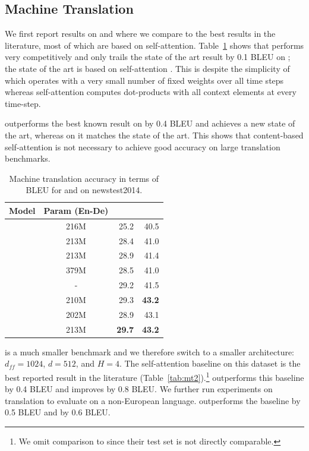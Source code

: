 \subsection{Machine Translation}\label{sec:translation}

We first report results on \ende{} and \enfr{} where we compare to the best results in the literature, most of which are based on self-attention.
Table~\ref{tab:mt1} shows that \sdconv{} performs very competitively and only trails the state of the art result by 0.1 BLEU on \enfr{}; the state of the art is based on self-attention \citep{ott2018scaling}.
This is despite the simplicity of \sdconv{} which operates with a very small number of fixed weights over all time steps whereas self-attention computes dot-products with all context elements at every time-step.

\tvsdconv{} outperforms the best known result on \ende{} by 0.4 BLEU and achieves a new state of the art, whereas on \enfr{} it matches the state of the art.
This shows that content-based self-attention is not necessary to achieve good accuracy on large translation benchmarks.

\begin{table}[t]
\centering
\begin{tabular}{lcrr}
\toprule
Model & Param (En-De) & \ende{} & \enfr{} \\
\midrule
\citet{gehring2017convs2s} & 216M & 25.2 & 40.5 \\
\citet{vaswani2017transformer} & 213M & 28.4 & 41.0 \\
\citet{ahmed2017WeightedTN} & 213M & 28.9 & 41.4 \\
\citet{chen2018arxiv} & 379M & 28.5 & 41.0 \\
\citet{shaw2018relpos}  & - & 29.2 & 41.5 \\
\citet{ott2018scaling} & 210M & 29.3 & \textbf{43.2} \\
\midrule
\sdconv{} & 202M & 28.9 & 43.1 \\
\tvsdconv{} & 213M & \textbf{29.7} & \textbf{43.2} \\
\bottomrule
\end{tabular}
\caption{Machine translation accuracy in terms of BLEU for \ende{} and \enfr{} on newstest2014.}
\label{tab:mt1}
\end{table}

\iwslt{} is a much smaller benchmark and we therefore switch to a smaller architecture: $d_{ff} = 1024$, $d=512$, and $H=4$. 
The self-attention baseline on this dataset is the best reported result in the literature (Table~\ref{tab:mt2}).\footnote{We omit comparison to \citet{elbayad2018pervasiveattn} since their test set is not directly comparable.}
\sdconv{} outperforms this baseline by 0.4 BLEU and \tvsdconv{} improves by 0.8 BLEU.
We further run experiments on \zhen{} translation to evaluate on a non-European language.
\sdconv{} outperforms the baseline by 0.5 BLEU and \tvsdconv{} by 0.6 BLEU. 

